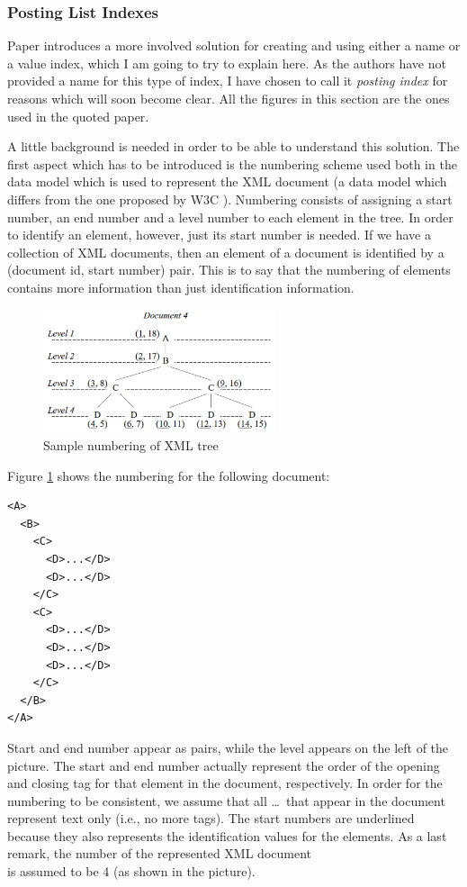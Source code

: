 \documentclass[a4paper,10pt]{article}
\begin{document}
\subsubsection*{Posting List Indexes}

Paper \cite{hal03} introduces a more involved solution for creating and using either a
name or a value index, which I am going to try to explain here. As the authors have
not provided a name for this type of index, I have chosen to call it \textit{posting index}
for reasons which will soon become clear. All the figures in this section are the ones used
in the quoted paper.

A little background is needed in order to be able to understand this solution. The first
aspect which has to be introduced is the numbering scheme used both in the data model
which is used to represent the XML document (a data model which differs from the one
proposed by W3C \cite{w3cdm}). Numbering consists of assigning a start number, an
end number and a level number to each element in the tree. In order to identify an
element, however, just its start number is needed. If we have a collection of XML
documents, then an element of a document is identified by a (document id, start
number) pair. This is to say that the numbering of elements contains more information
than just identification information.

\begin{figure}[ht]
\begin{center}
\includegraphics[width=2.7in]{img/numb.png}
\end{center}
\caption{Sample numbering of XML tree}
\label{fig:numb}
\end{figure}

Figure \ref{fig:numb} shows the numbering for the following document:

\begin{verbatim}
<A>
  <B>
    <C>
      <D>...</D>
      <D>...</D>
    </C>
    <C>
      <D>...</D>
      <D>...</D>
      <D>...</D>
    </C>
  </B>
</A>
\end{verbatim}

Start and end number appear as pairs, while the level appears on the left of the picture.
The start and end number actually represent the order of the opening and closing tag for
that element in the document, respectively. In order for the numbering to be consistent,
we assume that all \ldots\ that appear in the document represent text only (i.e., no more
tags). The start numbers are underlined because they also represents the identification
values for the elements. As a last remark, the number of the represented XML document\\
is assumed to be 4 (as shown in the picture).
\end{document}
